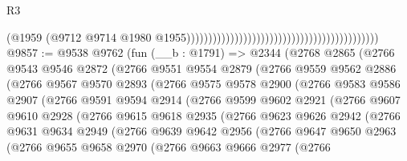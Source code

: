 \begin{lexlean}{R3}
\begin{coremodule}
                                                                                        (@1959
                                                                                          (@9712
                                                                                            @9714
                                                                                            @1980
                                                                                            @1955))))))))))))))))))))))))))))))))))))))))))))
@9857 := @9538
    @9762
    (fun (__b : @1791) =>
    @2344
      (@2768
        @2865
        (@2766
          @9543
          @9546
          @2872
          (@2766
            @9551
            @9554
            @2879
            (@2766
              @9559
              @9562
              @2886
              (@2766
                @9567
                @9570
                @2893
                (@2766
                  @9575
                  @9578
                  @2900
                  (@2766
                    @9583
                    @9586
                    @2907
                    (@2766
                      @9591
                      @9594
                      @2914
                      (@2766
                        @9599
                        @9602
                        @2921
                        (@2766
                          @9607
                          @9610
                          @2928
                          (@2766
                            @9615
                            @9618
                            @2935
                            (@2766
                              @9623
                              @9626
                              @2942
                              (@2766
                                @9631
                                @9634
                                @2949
                                (@2766
                                  @9639
                                  @9642
                                  @2956
                                  (@2766
                                    @9647
                                    @9650
                                    @2963
                                    (@2766
                                      @9655
                                      @9658
                                      @2970
                                      (@2766
                                        @9663
                                        @9666
                                        @2977
                                        (@2766

\end{coremodule}
\end{lexlean}
